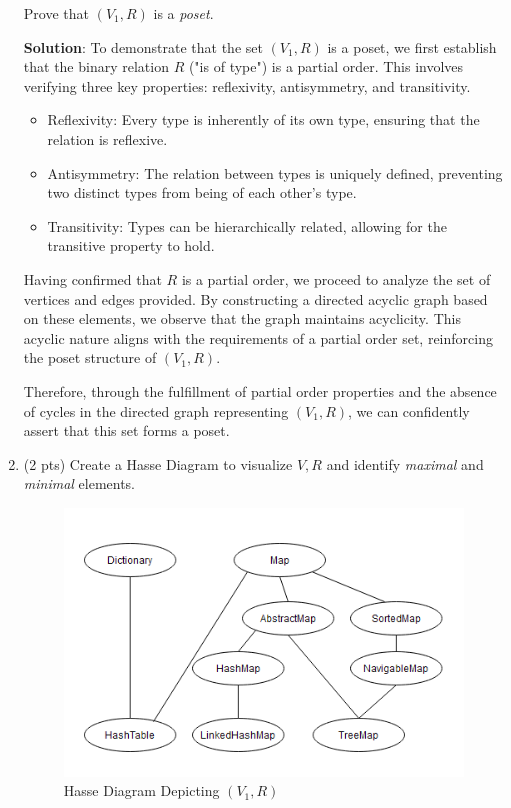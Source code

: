 \documentclass[12pt]{article}
\begin{document}
\begin{spacing}{1.5}
\begin{enumerate}
		      Prove that $(V_1, R)$ is a \textit{poset}.
		      		      
		      \textbf{Solution}:  To demonstrate that the set $(V_1, R)$ is a poset, we first establish that the binary relation $R$ ("is of type") is a partial order. This involves verifying three key properties: reflexivity, antisymmetry, and transitivity.
		      
		      \begin{itemize}
		      	\item Reflexivity: Every type is inherently of its own type, ensuring that the relation is reflexive.
		      	              
		      	\item Antisymmetry: The relation between types is uniquely defined, preventing two distinct types from being of each other's type.
		      	              
		      	\item Transitivity: Types can be hierarchically related, allowing for the transitive property to hold.
		      	              
		      \end{itemize} 
		      
		      Having confirmed that $R$ is a partial order, we proceed to analyze the set of vertices and edges provided. By constructing a directed acyclic graph based on these elements, we observe that the graph maintains acyclicity. This acyclic nature aligns with the requirements of a partial order set, reinforcing the poset structure of $(V_1, R)$. 
		                  
		      Therefore, through the fulfillment of partial order properties and the absence of cycles in the directed graph representing $(V_1, R)$, we can confidently assert that this set forms a poset.       
		      		              
		\item (2 pts) Create a Hasse Diagram to visualize $V, R$ and identify \textit{maximal} and \textit{minimal} elements.
		      
		      \begin{figure}[htp]
		      	\centering
		      	\includegraphics{HasseDiagram_6_3_1.png}
		      	\caption{Hasse Diagram Depicting $(V_1,R)$}
		      	\label{fig:figure}
		      \end{figure}
		           

\end{enumerate}
\end{spacing}
\end{document}
